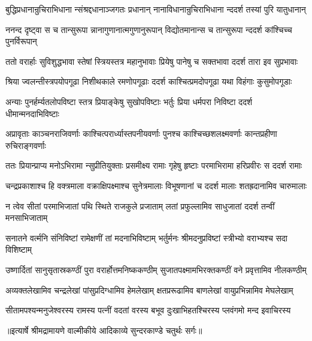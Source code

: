 \fourlineindentedshloka
{बुद्धिप्रधानान्रुचिराभिधाना}
{न्संश्रद्दधानाञ्जगतः प्रधानान्}
{नानाविधानान्रुचिराभिधाना}
{न्ददर्श तस्यां पुरि यातुधानान्} %

\fourlineindentedshloka
{ननन्द दृष्ट्वा स च तान्सुरूपा}
{न्नानागुणानात्मगुणानुरूपान्}
{विद्योतमानान्स च तान्सुरूपा}
{न्ददर्श कांश्चिच्च पुनर्विरूपान्} %

\fourlineindentedshloka
{ततो वरार्हाः सुविशुद्धभावा}
{स्तेषां स्त्रियस्तत्र महानुभावाः}
{प्रियेषु पानेषु च सक्तभावा}
{ ददर्श तारा इव सुप्रभावाः} %

\fourlineindentedshloka
{श्रिया ज्वलन्तीस्त्रपयोपगूढा}
{ निशीथकाले रमणोपगूढाः}
{ददर्श काश्चित्प्रमदोपगूढा}
{ यथा विहंगाः कुसुमोपगूडाः} %

\fourlineindentedshloka
{अन्याः पुनर्हर्म्यतलोपविष्टा}
{स्तत्र प्रियाङ्केषु सुखोपविष्टाः}
{भर्तुः प्रिया धर्मपरा निविष्टा}
{ ददर्श धीमान्मनदाभिविष्टाः} %

\fourlineindentedshloka
{अप्रावृताः काञ्चनराजिवर्णाः}
{ काश्चित्परार्ध्यास्तपनीयवर्णाः}
{पुनश्च काश्चिच्छशलक्ष्मवर्णाः}
{ कान्तप्रहीणा रुचिराङ्गवर्णाः} %

\fourlineindentedshloka
{ततः प्रियान्प्राप्य मनोऽभिरामा}
{न्सुप्रीतियुक्ताः प्रसमीक्ष्य रामाः}
{गृहेषु हृष्टाः परमाभिरामा}
{ हरिप्रवीरः स ददर्श रामाः} %

\fourlineindentedshloka
{चन्द्रप्रकाशाश्च हि वक्त्रमाला}
{ वक्राक्षिपक्ष्माश्च सुनेत्रमालाः}
{विभूषणानां च ददर्श मालाः}
{ शतह्रदानामिव चारुमालाः} %

\fourlineindentedshloka
{न त्वेव सीतां परमाभिजातां}
{ पथि स्थिते राजकुले प्रजाताम्}
{लतां प्रफुल्लामिव साधुजातां}
{ ददर्श तन्वीं मनसाभिजाताम्} %

\fourlineindentedshloka
{सनातने वर्त्मनि संनिविष्टां}
{ रामेक्षणीं तां मदनाभिविष्टाम्}
{भर्तुर्मनः श्रीमदनुप्रविष्टां}
{ स्त्रीभ्यो वराभ्यश्च सदा विशिष्टाम्} %

\fourlineindentedshloka
{उष्णार्दितां सानुसृतास्रकण्ठीं}
{ पुरा वरार्होत्तमनिष्ककण्ठीम्}
{सुजातपक्ष्मामभिरक्तकण्ठीं}
{ वने प्रवृत्तामिव नीलकण्ठीम्} %

\fourlineindentedshloka
{अव्यक्तलेखामिव चन्द्रलेखां}
{ पांसुप्रदिग्धामिव हेमलेखाम्}
{क्षतप्ररूढामिव बाणलेखां}
{ वायुप्रभिन्नामिव मेघलेखाम्} %

\fourlineindentedshloka
{सीतामपश्यन्मनुजेश्वरस्य}
{ रामस्य पत्नीं वदतां वरस्य}
{बभूव दुःखाभिहतश्चिरस्य}
{ प्लवंगमो मन्द इवाचिरस्य} %


{॥इत्यार्षे श्रीमद्रामायणे वाल्मीकीये आदिकाव्ये सुन्दरकाण्डे चतुर्थः सर्गः॥}

